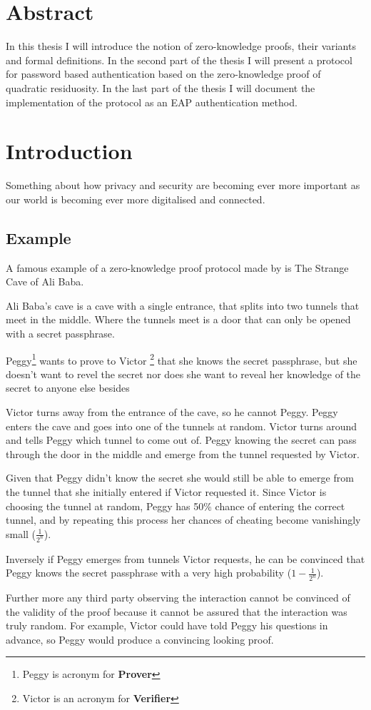 \section{Abstract}
In this thesis I will introduce the notion of zero-knowledge proofs, their variants and formal definitions.
In the second part of the thesis I will present a protocol for password based authentication based on the zero-knowledge proof of quadratic residuosity.
In the last part of the thesis I will document the implementation of the protocol as an EAP authentication method.

\section{Introduction}
Something about how privacy and security are becoming ever more important as our world is becoming ever more digitalised and connected.

\subsection{Example}

A famous example of a zero-knowledge proof protocol made by \cite{QJM} is The Strange Cave of Ali Baba.

\bigskip

Ali Baba's cave is a cave with a single entrance, that splits into two tunnels that meet in the middle. Where the tunnels meet is a door that can only be opened with a secret passphrase.

\bigskip

Peggy\footnote{Peggy is acronym for \textbf{Prover}} wants to prove to Victor \footnote{Victor is an acronym for \textbf{Verifier}} that she knows the secret passphrase, but she doesn't want to revel the secret nor does she want to reveal her knowledge of the secret to anyone else besides 

\bigskip

Victor turns away from the entrance of the cave, so he cannot Peggy. Peggy enters the cave and goes into one of the tunnels at random. Victor turns around and tells Peggy which tunnel to come out of. Peggy knowing the secret can pass through the door in the middle and emerge from the tunnel requested by Victor.

\bigskip

Given that Peggy didn't know the secret she would still be able to emerge from the tunnel that she initially entered if Victor requested it. Since Victor is choosing the tunnel at random, Peggy has 50\% chance of entering the correct tunnel, and by repeating this process her chances of cheating become vanishingly small ($\frac{1}{2^n}$).

Inversely if Peggy emerges from tunnels Victor requests, he can be convinced that Peggy knows the secret passphrase with a very high probability ($1 - \frac{1}{2^n}$).

\bigskip

Further more any third party observing the interaction cannot be convinced of the validity of the proof because it cannot be assured that the interaction was truly random. For example, Victor could have told Peggy his questions in advance, so Peggy would produce a convincing looking proof.
